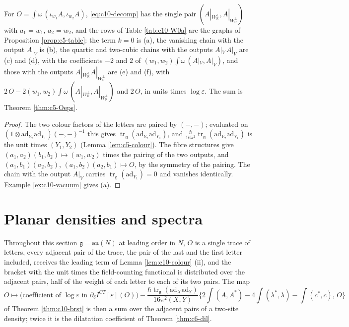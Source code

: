 \begin{corollary}
\label{cor:c10-bilinear}
For $O=\int\omega\,(\iota_{w_1}A,\iota_{w_2}A)$, \eqref{eq:c10-decomp} has the single pair $(A|_{W_{\mathbb R}^\perp},A|_{W_{\mathbb R}^\perp})$ with $a_1=w_1$, $a_2=w_2$, and the rows of Table \ref{tab:c10-W0a} are the graphs of Proposition \ref{prop:c5-table}: the term $k=0$ is (a), the vanishing chain with the output $A|_V$ is (b), the quartic and two-cubic chains with the outputs $A|_V\,A|_V$ are (c) and (d), with the coefficients $-2$ and $2$ of $(w_1,w_2)\int\omega\,(A|_V,A|_V)$, and those with the outputs $A|_{W_{\mathbb R}^\perp}A|_{W_{\mathbb R}^\perp}$ are (e) and (f), with $2\,O-2(w_1,w_2)\int\omega\,(A|_{W_{\mathbb R}^\perp},A|_{W_{\mathbb R}^\perp})$ and $2\,O$, in units times $\log\varepsilon$. The sum is Theorem \ref{thm:c5-Oeps}.
\end{corollary}

\begin{proof}
The two colour factors of the letters are paired by $(-,-)$; evaluated on $(1\otimes\mathrm{ad}_{Y_2}\mathrm{ad}_{Y_1})(-,-)^{-1}$ this gives $\operatorname{tr}_{\mathfrak g}(\mathrm{ad}_{Y_2}\mathrm{ad}_{Y_1})$, and $\frac{\hbar}{16\pi^2}\operatorname{tr}_{\mathfrak g}(\mathrm{ad}_{Y_2}\mathrm{ad}_{Y_1})$ is the unit times $(Y_1,Y_2)$ (Lemma \ref{lem:c5-colour}). The fibre structures give $(a_1,a_2)(b_1,b_2)\mapsto(w_1,w_2)$ times the pairing of the two outputs, and $(a_1,b_1)(a_2,b_2)$, $(a_1,b_2)(a_2,b_1)\mapsto O$, by the symmetry of the pairing. The chain with the output $A|_V$ carries $\operatorname{tr}_{\mathfrak g}(\mathrm{ad}_{Y_1})=0$ and vanishes identically. Example \ref{ex:c10-vacuum} gives (a).
\end{proof}

\section{Planar densities and spectra}

Throughout this section $\mathfrak g=\mathfrak{su}(N)$ at leading order in $N$, $O$ is a single trace of letters, every adjacent pair of the trace, the pair of the last and the first letter included, receives the leading term of Lemma \ref{lem:c10-colour} (ii), and the bracket with the unit times the field-counting functional is distributed over the adjacent pairs, half of the weight of each letter to each of its two pairs. The map
\[
O\longmapsto\big(\text{coefficient of }\log\varepsilon\text{ in }\partial_\delta I^{CT}[\varepsilon](O)\big)-\frac{\hbar\operatorname{tr}_{\mathfrak g}(\mathrm{ad}_X\mathrm{ad}_Y)}{16\pi^2(X,Y)}\Big\{2\int(A,A^*)-4\int(\lambda^*,\lambda)-\int(c^*,c),\,O\Big\}
\]
of Theorem \ref{thm:c10-brst} is then a sum over the adjacent pairs of a two-site density; twice it is the dilatation coefficient of Theorem \ref{thm:c6-dil}.

